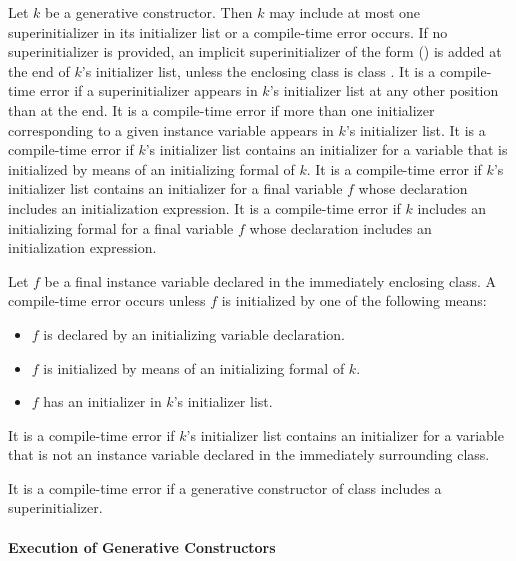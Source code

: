\documentclass[makeidx]{article}
\begin{document}
\LMHash{}%
Let $k$ be a generative constructor.
Then $k$ may include at most one superinitializer in its initializer list or a compile-time error occurs.
If no superinitializer is provided, an implicit superinitializer of the form \SUPER{}() is added at the end of $k$'s initializer list,
unless the enclosing class is class .
It is a compile-time error if a superinitializer appears in $k$'s initializer list at any other position than at the end.
It is a compile-time error if more than one initializer corresponding to a given instance variable appears in $k$'s initializer list.
It is a compile-time error if $k$'s initializer list contains an initializer for a variable that is initialized by means of an initializing formal of $k$.
It is a compile-time error if $k$'s initializer list contains an initializer for a final variable $f$ whose declaration includes an initialization expression.
It is a compile-time error if $k$ includes an initializing formal for a final variable $f$ whose declaration includes an initialization expression.

\LMHash{}%
Let $f$ be a final instance variable declared in
the immediately enclosing class.
A compile-time error occurs unless $f$ is initialized
by one of the following means:
\begin{itemize}
\item $f$ is declared by an initializing variable declaration.
\item $f$ is initialized by means of an initializing formal of $k$.
\item $f$ has an initializer in $k$'s initializer list.
\end{itemize}

\LMHash{}%
It is a compile-time error if $k$'s initializer list contains an initializer for a variable that is not an instance variable declared in the immediately surrounding class.


\LMHash{}%
It is a compile-time error if a generative constructor of class  includes a superinitializer.


\paragraph{Execution of Generative Constructors}
\end{document}
